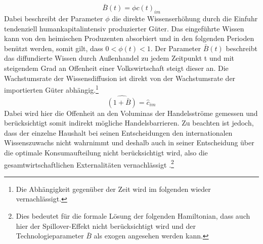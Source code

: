 \begin{equation}
\bar{B}(t)=\phi c(t)_{im}\label{Offenheit}
\end{equation}
Dabei beschreibt der Parameter $\phi$ die direkte Wissenserhöhung durch die Einfuhr tendenziell humankapitalintensiv produzierter Güter. Das eingeführte Wissen kann von den heimischen Produzenten absorbiert und in den folgenden Perioden benützt werden, somit gilt, dass $0<\phi(t)<1$. Der Parameter $\bar{B}(t)$ beschreibt das diffundierte Wissen durch Au{\ss}enhandel zu jedem Zeitpunkt t und mit steigendem Grad an Offenheit einer Volkswirtschaft steigt dieser an. Die Wachstumsrate der Wissensdiffusion ist direkt von der Wachstumsrate der importierten Güter abhängig.\footnote{Die Abhängigkeit gegenüber der Zeit wird im folgenden wieder vernachlässigt.}
\begin{equation}
\widehat{(1+\bar{B})}=\hat{c}_{im}
\end{equation} 
Dabei wird hier die Offenheit an den Voluminas der Handelsströme gemessen und berücksichtigt somit indirekt mögliche Handelsbarrieren. Zu beachten ist jedoch, dass der einzelne Haushalt bei seinen Entscheidungen den internationalen Wissenszuwachs nicht wahrnimmt und deshalb auch in seiner Entscheidung über die optimale Konsumaufteilung nicht berücksichtigt wird, also die gesamtwirtschaftlichen Externalitäten vernachlässigt \citep{Romer.1986}.\footnote{Dies bedeutet für die formale Lösung der folgenden Hamiltonian, dass auch hier der Spillover-Effekt nicht berücksichtigt wird und der Technologieparameter $\bar{B}$ als exogen angesehen werden kann.}


